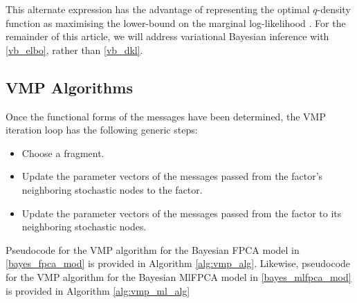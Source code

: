 \documentclass[12pt]{article}
\theoremstyle{plain}
\theoremstyle{definition}
\theoremstyle{remark}
\begin{document}
\noindent This alternate expression has the advantage of representing the
optimal $q$-density function as maximising the lower-bound on the marginal log-likelihood \cite{rohde16}.
For the remainder
of this article, we will address variational Bayesian inference with \eqref{vb_elbo}, rather than \eqref{vb_dkl}.


\subsection{VMP Algorithms}
\label{app:vmp_algs}

Once the functional forms of the messages have been determined, the VMP iteration loop has the following
generic steps:

\begin{itemize}
	\item Choose a fragment.
	\item Update the parameter vectors of the messages passed from the factor’s neighboring stochastic
	nodes to the factor.
	\item Update the parameter vectors of the messages passed from the factor to its neighboring
	stochastic nodes.
\end{itemize}

Pseudocode for the VMP algorithm for the Bayesian FPCA model in \eqref{bayes_fpca_mod} is provided
in Algorithm \ref{alg:vmp_alg}. Likewise, pseudocode for the VMP algorithm for the Bayesian MlFPCA
model in \eqref{bayes_mlfpca_mod} is provided in Algorithm \ref{alg:vmp_ml_alg}
\end{document}
